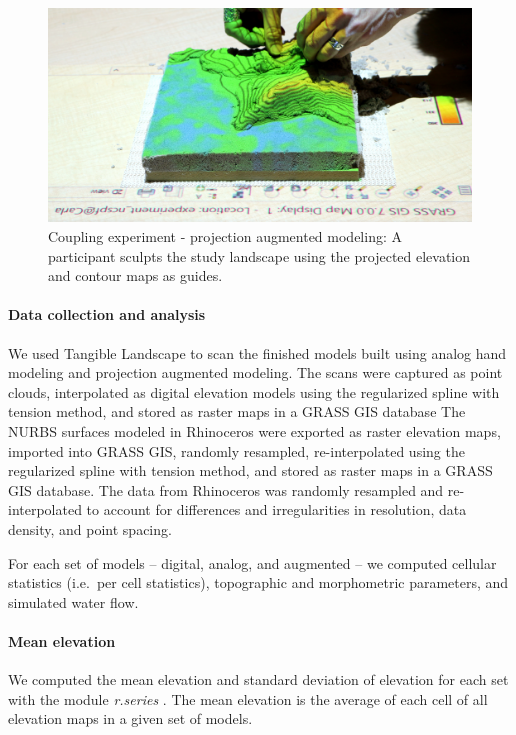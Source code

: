 \documentclass[prodmode,acmtochi]{acmsmall} %
\begin{document}
\begin{figure}
\begin{center}
	\includegraphics[width=\textwidth]{images/experiments/carla_proj_aug.jpg}
	\caption{Coupling experiment - projection augmented modeling:
	A participant sculpts the study landscape using
	the projected elevation and contour maps
	as guides.}
	\label{fig:proj_aug}
\end{center}
\end{figure}

\paragraph{Data collection and analysis}
We used Tangible Landscape to scan the finished models 
built using analog hand modeling and projection augmented modeling.
The scans were captured as point clouds, interpolated 
as digital elevation models using the regularized spline with tension method,
and stored as raster maps in a GRASS GIS database 
The NURBS surfaces modeled in Rhinoceros were exported as raster elevation maps,
imported into GRASS GIS, randomly resampled, 
re-interpolated using the regularized spline with tension method, 
and stored as raster maps in a GRASS GIS database. 
The data from Rhinoceros was randomly resampled and re-interpolated
to account for differences and irregularities in resolution, data density, and point spacing.

For each set of models -- digital, analog, and augmented --
we computed cellular statistics (i.e.~per cell statistics), 
topographic and morphometric parameters, 
and simulated water flow.

\paragraph{Mean elevation}
We computed 
the mean elevation 
and standard deviation of elevation
for each set
with the module \textit{r.series} \cite{r.series}.
The mean elevation is the average of each cell 
of all elevation maps in a given set of models.
\end{document}
